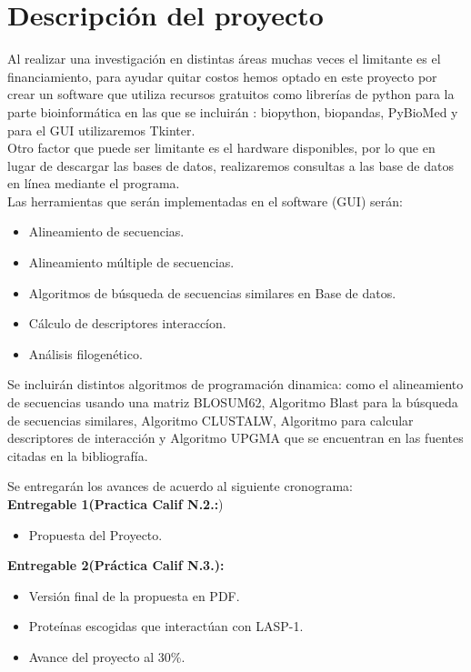 \documentclass[twocolumn,twoside,11pt]{article}
\begin{document}
\section{Descripci\'on del proyecto}
Al realizar una investigaci\'on en distintas \'areas muchas veces el limitante  es el financiamiento,  para ayudar quitar costos hemos optado en este proyecto por crear un software que utiliza recursos gratuitos como librer\'ias de python para la parte bioinform\'atica en las que se incluir\'an : biopython, biopandas, PyBioMed y para el GUI utilizaremos Tkinter.\\
Otro factor que puede ser limitante es el hardware disponibles, por lo que en lugar de descargar las bases de datos, realizaremos consultas a las base de datos en l\'inea mediante el programa.\\

Las herramientas que ser\'an implementadas en el software (GUI) ser\'an: 
\begin{itemize}
 \item Alineamiento de secuencias. 
 \item Alineamiento m\'ultiple de secuencias.
 \item Algoritmos de b\'usqueda de secuencias similares en Base de datos.
 \item C\'alculo de descriptores interacc\'ion.
 \item An\'alisis filogen\'etico.
\end{itemize}

  
Se incluir\'an distintos algoritmos de programaci\'on dinamica: como el alineamiento de secuencias usando una matriz BLOSUM62, Algoritmo Blast para la b\'usqueda de secuencias similares, Algoritmo CLUSTALW, Algoritmo para calcular descriptores de interacci\'on y Algoritmo UPGMA que se encuentran en las fuentes citadas en la bibliograf\'ia.  

Se entregar\'an los avances de acuerdo al siguiente cronograma:\\

\textbf{Entregable 1(Practica Calif N.2.:})
\begin{itemize}
\item Propuesta del Proyecto.\\
\end{itemize}


\textbf{Entregable 2(Práctica Calif N.3.):}
\begin{itemize}
\item Versi\'on final de la propuesta en PDF.
\item Prote\'inas escogidas que interact\'uan con LASP-1.
\item Avance del proyecto al 30\%.\\
\end{itemize}
\end{document}
